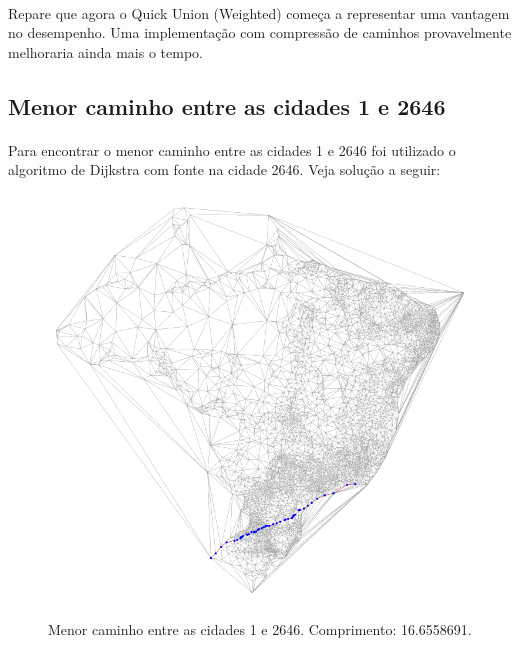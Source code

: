 \documentclass[11pt,a4paper]{article}
\begin{document}
        \paragraph{}
        Repare que agora o Quick Union (Weighted) começa a representar uma vantagem no desempenho. Uma implementação com compressão de caminhos provavelmente melhoraria ainda mais o tempo.
        \newpage

        \subsection{Menor caminho entre as cidades 1 e 2646}
        \paragraph{}
        Para encontrar o menor caminho entre as cidades 1 e 2646 foi utilizado o algoritmo de Dijkstra com fonte na cidade 2646.  Veja solução a seguir:

        \begin{figure}[htb!]
          \centering
              \captionsetup{justification=centering}  
              \includegraphics[scale=0.45]{BR1-2646}
              \label{fig:BR12646}
              \caption{Menor caminho entre as cidades 1 e 2646. Comprimento: 16.6558691.}
        \end{figure}
\end{document}
